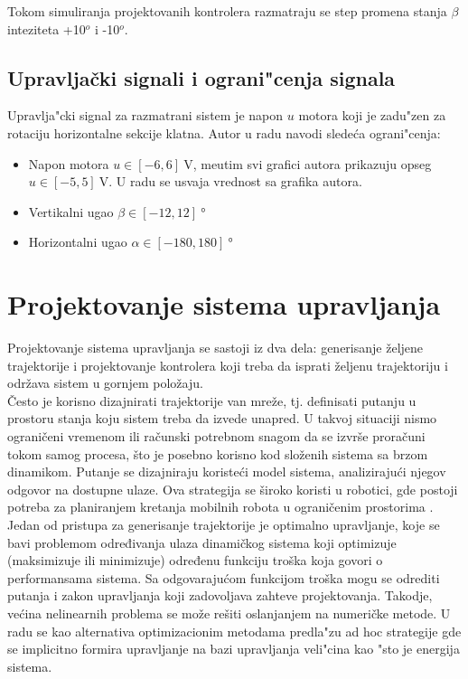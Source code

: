 \documentclass[a4paper,11pt]{article}
\theoremstyle{definition} \newtheorem{deff}{Definicija}[section]
\theoremstyle{definition} \newtheorem{prim}[deff]{Primer}
\theoremstyle{plain} \newtheorem{teor}[deff]{Teorema}
\begin{document}
	 Tokom simuliranja projektovanih kontrolera razmatraju se step promena stanja $\beta$ inteziteta +10$^o$ i -10$^o$. \\[16pt]
	 

	\subsection{Upravljački signali i ograni"cenja signala}
	
	Upravlja"cki signal za razmatrani sistem je napon $u$ motora koji je zadu"zen za rotaciju horizontalne sekcije klatna. Autor u radu \cite{inicijalna} navodi slede\'ca ograni"cenja:
	
	\begin{itemize}
		\item Napon motora $u \in [-6, 6] ~\text{V}$, me\dj utim svi grafici autora prikazuju opseg $u \in [-5, 5] ~\text{V}$. U radu se usvaja vrednost sa grafika autora.
		\item Vertikalni ugao  $\beta \in [-12, 12] ~\text{°}$
		\item Horizontalni ugao  $\alpha \in [-180, 180] ~\text{°}$
	\end{itemize}
	
	\clearpage
	
	
	\section{Projektovanje sistema upravljanja}
	
	Projektovanje sistema upravljanja se sastoji iz dva dela: generisanje željene trajektorije i projektovanje kontrolera koji treba da isprati željenu trajektoriju i održava sistem u gornjem položaju. \\
	
	Često je korisno dizajnirati trajektorije van mreže, tj. definisati putanju u prostoru stanja koju sistem treba da izvede unapred. U takvoj situaciji nismo ograničeni vremenom ili računski potrebnom snagom da se izvrše proračuni tokom samog procesa, što je posebno korisno kod složenih sistema sa brzom dinamikom. Putanje se dizajniraju koristeći model sistema, analizirajući njegov odgovor na dostupne ulaze. Ova strategija se široko koristi u robotici, gde postoji potreba za planiranjem kretanja mobilnih robota u ograničenim prostorima \cite{inicijalna}. \\
	
	Jedan od pristupa za generisanje trajektorije je optimalno upravljanje,  koje se bavi problemom određivanja ulaza dinamičkog sistema koji optimizuje (maksimizuje ili minimizuje) određenu funkciju troška koja govori o performansama sistema. Sa odgovarajućom funkcijom troška mogu se odrediti putanja i zakon upravljanja koji zadovoljava zahteve projektovanja. Takodje, većina nelinearnih problema se može rešiti oslanjanjem na numeričke metode. U radu se \cite{inicijalna} kao alternativa optimizacionim metodama predla"zu ad hoc strategije gde se implicitno formira upravljanje na bazi upravljanja veli"cina kao "sto je energija sistema. \\
	
\end{document}
